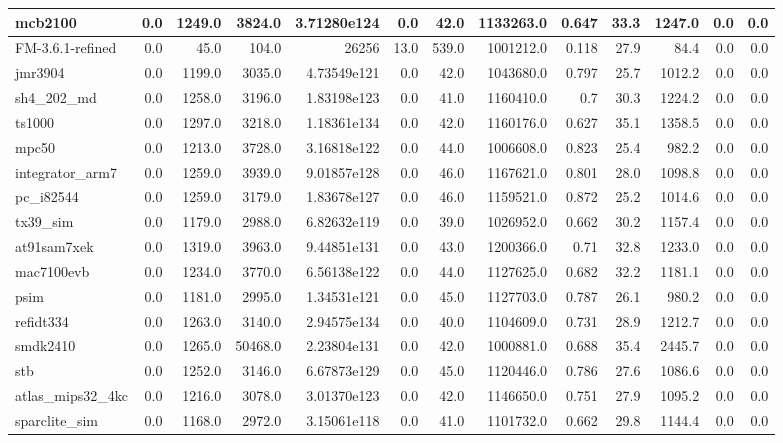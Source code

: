 \begin{tabular}{|l r r r r| r r r r r r | r r|}
\hline
mcb2100 & 0.0 & 1249.0 & 3824.0 & 3.71280e124 & 0.0 & 42.0 & 1133263.0 & 0.647 & 33.3 & 1247.0 & 0.0 & 0.0 \\
\hline
FM-3.6.1-refined & 0.0 & 45.0 & 104.0 & 26256 & 13.0 & 539.0 & 1001212.0 & 0.118 & 27.9 & 84.4 & 0.0 & 0.0 \\
\hline
jmr3904 & 0.0 & 1199.0 & 3035.0 & 4.73549e121 & 0.0 & 42.0 & 1043680.0 & 0.797 & 25.7 & 1012.2 & 0.0 & 0.0 \\
\hline
sh4\_202\_md & 0.0 & 1258.0 & 3196.0 & 1.83198e123 & 0.0 & 41.0 & 1160410.0 & 0.7 & 30.3 & 1224.2 & 0.0 & 0.0 \\
\hline
ts1000 & 0.0 & 1297.0 & 3218.0 & 1.18361e134 & 0.0 & 42.0 & 1160176.0 & 0.627 & 35.1 & 1358.5 & 0.0 & 0.0 \\
\hline
mpc50 & 0.0 & 1213.0 & 3728.0 & 3.16818e122 & 0.0 & 44.0 & 1006608.0 & 0.823 & 25.4 & 982.2 & 0.0 & 0.0 \\
\hline
integrator\_arm7 & 0.0 & 1259.0 & 3939.0 & 9.01857e128 & 0.0 & 46.0 & 1167621.0 & 0.801 & 28.0 & 1098.8 & 0.0 & 0.0 \\
\hline
pc\_i82544 & 0.0 & 1259.0 & 3179.0 & 1.83678e127 & 0.0 & 46.0 & 1159521.0 & 0.872 & 25.2 & 1014.6 & 0.0 & 0.0 \\
\hline
tx39\_sim & 0.0 & 1179.0 & 2988.0 & 6.82632e119 & 0.0 & 39.0 & 1026952.0 & 0.662 & 30.2 & 1157.4 & 0.0 & 0.0 \\
\hline
at91sam7xek & 0.0 & 1319.0 & 3963.0 & 9.44851e131 & 0.0 & 43.0 & 1200366.0 & 0.71 & 32.8 & 1233.0 & 0.0 & 0.0 \\
\hline
mac7100evb & 0.0 & 1234.0 & 3770.0 & 6.56138e122 & 0.0 & 44.0 & 1127625.0 & 0.682 & 32.2 & 1181.1 & 0.0 & 0.0 \\
\hline
psim & 0.0 & 1181.0 & 2995.0 & 1.34531e121 & 0.0 & 45.0 & 1127703.0 & 0.787 & 26.1 & 980.2 & 0.0 & 0.0 \\
\hline
refidt334 & 0.0 & 1263.0 & 3140.0 & 2.94575e134 & 0.0 & 40.0 & 1104609.0 & 0.731 & 28.9 & 1212.7 & 0.0 & 0.0 \\
\hline
smdk2410 & 0.0 & 1265.0 & 50468.0 & 2.23804e131 & 0.0 & 42.0 & 1000881.0 & 0.688 & 35.4 & 2445.7 & 0.0 & 0.0 \\
\hline
stb & 0.0 & 1252.0 & 3146.0 & 6.67873e129 & 0.0 & 45.0 & 1120446.0 & 0.786 & 27.6 & 1086.6 & 0.0 & 0.0 \\
\hline
atlas\_mips32\_4kc & 0.0 & 1216.0 & 3078.0 & 3.01370e123 & 0.0 & 42.0 & 1146650.0 & 0.751 & 27.9 & 1095.2 & 0.0 & 0.0 \\
\hline
sparclite\_sim & 0.0 & 1168.0 & 2972.0 & 3.15061e118 & 0.0 & 41.0 & 1101732.0 & 0.662 & 29.8 & 1144.4 & 0.0 & 0.0 \\

\end{tabular}
